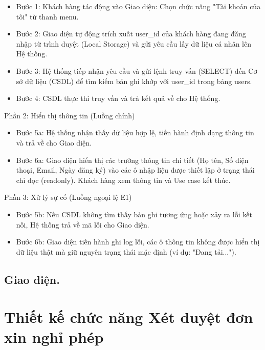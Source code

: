 \documentclass[../BTL.tex]{subfiles}
\begin{document}
\begin{itemize}
\item
  Bước 1: Khách hàng tác động vào Giao diện: Chọn chức năng "Tài khoản
  của tôi" từ thanh menu.
\item
  Bước 2: Giao diện tự động trích xuất user\_id của khách hàng đang đăng
  nhập từ trình duyệt (Local Storage) và gửi yêu cầu lấy dữ liệu cá nhân
  lên Hệ thống.
\item
  Bước 3: Hệ thống tiếp nhận yêu cầu và gửi lệnh truy vấn (SELECT) đến
  Cơ sở dữ liệu (CSDL) để tìm kiếm bản ghi khớp với user\_id trong bảng
  users.
\item
  Bước 4: CSDL thực thi truy vấn và trả kết quả về cho Hệ thống.
\end{itemize}

Phần 2: Hiển thị thông tin (Luồng chính)

\begin{itemize}
\item
  Bước 5a: Hệ thống nhận thấy dữ liệu hợp lệ, tiến hành định dạng thông
  tin và trả về cho Giao diện.
\item
  Bước 6a: Giao diện hiển thị các trường thông tin chi tiết (Họ tên, Số
  điện thoại, Email, Ngày đăng ký) vào các ô nhập liệu được thiết lập ở
  trạng thái chỉ đọc (readonly). Khách hàng xem thông tin và Use case
  kết thúc.
\end{itemize}

Phần 3: Xử lý sự cố (Luồng ngoại lệ E1)

\begin{itemize}
\item
  Bước 5b: Nếu CSDL không tìm thấy bản ghi tương ứng hoặc xảy ra lỗi kết
  nối, Hệ thống trả về mã lỗi cho Giao diện.
\item
  Bước 6b: Giao diện tiến hành ghi log lỗi, các ô thông tin không được
  hiển thị dữ liệu thật mà giữ nguyên trạng thái mặc định (ví dụ: "Đang
  tải...").
\end{itemize}

\subsection{Giao diện.}

\section{Thiết kế chức năng Xét duyệt đơn xin nghỉ phép}
\end{document}
